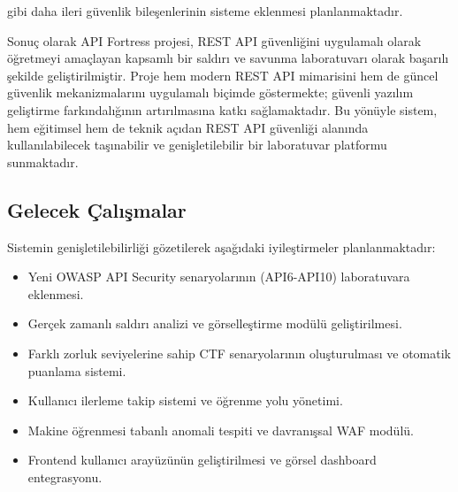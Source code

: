 gibi daha ileri güvenlik bileşenlerinin sisteme eklenmesi planlanmaktadır.

Sonuç olarak API Fortress projesi, REST API güvenliğini uygulamalı olarak öğretmeyi amaçlayan kapsamlı bir saldırı ve savunma laboratuvarı olarak başarılı şekilde geliştirilmiştir. Proje hem modern REST API mimarisini hem de güncel güvenlik mekanizmalarını uygulamalı biçimde göstermekte; güvenli yazılım geliştirme farkındalığının artırılmasına katkı sağlamaktadır. Bu yönüyle sistem, hem eğitimsel hem de teknik açıdan REST API güvenliği alanında kullanılabilecek taşınabilir ve genişletilebilir bir laboratuvar platformu sunmaktadır.

\subsection{Gelecek Çalışmalar}
\label{gelecek-calismalar}

Sistemin genişletilebilirliği gözetilerek aşağıdaki iyileştirmeler planlanmaktadır:

\begin{itemize}[leftmargin=*]
    \item Yeni OWASP API Security senaryolarının (API6-API10) laboratuvara eklenmesi.
    \item Gerçek zamanlı saldırı analizi ve görselleştirme modülü geliştirilmesi.
    \item Farklı zorluk seviyelerine sahip CTF senaryolarının oluşturulması ve otomatik puanlama sistemi.
    \item Kullanıcı ilerleme takip sistemi ve öğrenme yolu yönetimi.
    \item Makine öğrenmesi tabanlı anomali tespiti ve davranışsal WAF modülü.
    \item Frontend kullanıcı arayüzünün geliştirilmesi ve görsel dashboard entegrasyonu.
\end{itemize}

